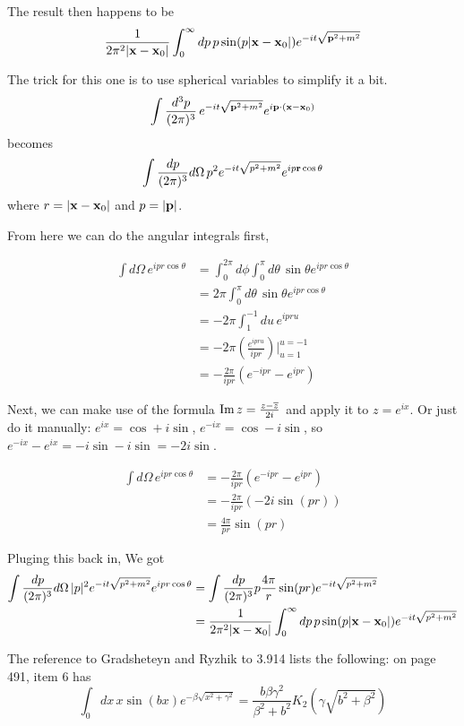 The result then happens to be
$$
\frac{1}{2\pi^2 |\boldsymbol{\mathbf{x}}-\boldsymbol{\mathbf{x}}_0|}
    \int_{0}^{\infty} dp \, p \sin(p|\boldsymbol{\mathbf{x}}-\boldsymbol{\mathbf{x}}_0|) e^{-it\sqrt{\boldsymbol{\mathbf{p}}^2 + m^2}}
$$

The trick for this one is to use spherical variables to simplify it a bit.
$$
\int \frac{d^3p}{(2\pi)^3} \, e^{-it\sqrt{\boldsymbol{\mathbf{p}}^2 + m^2}} e^{i\boldsymbol{\mathbf{p}}\cdot(\boldsymbol{\mathbf{x}} - \boldsymbol{\mathbf{x}}_0)} 
$$
becomes
$$
\int \frac{dp}{(2\pi)^3} d\Omega \, p^2 e^{-it\sqrt{p^2 + m^2}} e^{ip\boldsymbol{\mathbf{r}}\cos\theta} 
$$
where $r = |\boldsymbol{\mathbf{x}} - \boldsymbol{\mathbf{x}}_0|$ and $p = |\boldsymbol{\mathbf{p}}|$.

From here we can do the angular integrals first,

\begin{align*}
\int d\Omega \, e^{ipr\cos\theta} &= 
    \int_{0}^{2\pi} d\phi \int_{0}^{\pi} d\theta \, \sin\theta e^{ipr\cos\theta} \\
&= 2\pi \int_{0}^{\pi} d\theta \, \sin\theta e^{ipr\cos\theta} \\
&= -2\pi \int_{1}^{-1} du \, e^{ipr u} \\
&= -2\pi \left( \frac{ e^{ipr u} }{ ipr } \right) \Big|_{u=1}^{u=-1} \\
&= -\frac{2\pi}{ipr} \left( e^{-ipr} - e^{ipr} \right)
\end{align*}

Next, we can make use of the formula $\operatorname{Im}{z} = \frac{z - \overline{z}}{2i}$ and apply it to $z = e^{ix}$.
Or just do it manually: $e^{ix} = \cos + i\sin$, $e^{-ix} = \cos -i\sin$, so
$e^{-ix} - e^{ix} = -i\sin -i\sin = -2i \sin$.

\begin{align*}
\int d\Omega \, e^{ipr\cos\theta} &= 
    -\frac{2\pi}{ipr} \left( e^{-ipr} - e^{ipr} \right) \\
&= -\frac{2\pi}{ipr} \left(-2i \sin(pr) \right) \\
&= \frac{4\pi}{pr} \sin(pr)
\end{align*}

Pluging this back in,
We got
\begin{align}
\int \frac{dp}{(2\pi)^3} d\Omega \, |p|^2 e^{-it\sqrt{p^2 + m^2}} e^{ipr\cos\theta} &=
\int \frac{dp}{(2\pi)^3} p \frac{4\pi}{r} \sin(pr) e^{-it\sqrt{p^2 + m^2}} \\
&= \frac{1}{2\pi^2 |\boldsymbol{\mathbf{x}}-\boldsymbol{\mathbf{x}}_0|}
    \int_{0}^{\infty} dp \, p \sin(p|\boldsymbol{\mathbf{x}}-\boldsymbol{\mathbf{x}}_0|) e^{-it\sqrt{p^2 + m^2}} \label{kg-relativistic-simplified}
\end{align}

The reference to Gradsheteyn and Ryzhik to 3.914 lists the following: on page 491, item 6 has
\begin{equation}
\int_{0} dx\, x \sin(bx) e^{-\beta \sqrt{x^2 + \gamma^2}} =
    \frac{b \beta \gamma^2}{\beta^2 + b^2} K_2\left(\gamma \sqrt{b^2 + \beta^2}\right) \label{Gradsheteyn-kg-relativistic}
\end{equation}

